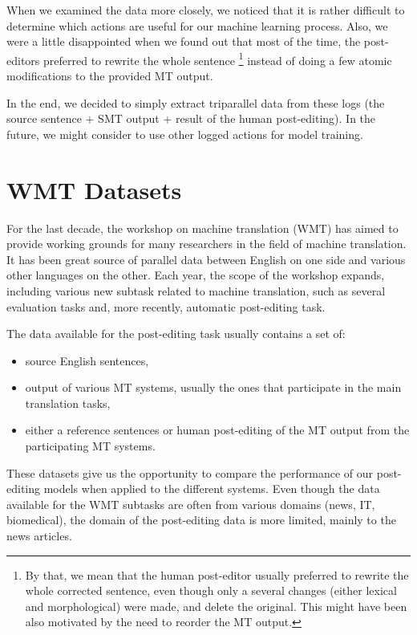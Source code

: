 When we examined the data more closely,
we noticed that it is rather difficult to determine which actions are
useful for our machine learning process. Also, we were a little disappointed
when we found out that most of the time, the post-editors preferred to
rewrite the whole sentence \footnote{By that, we mean that the
human post-editor usually preferred to rewrite the whole corrected sentence, even though
only a several changes (either lexical and morphological) were made, and delete the original.
This might have been also motivated by the need to reorder the MT output.}
instead of doing a few atomic modifications to the provided MT output.

In the end, we decided to simply extract triparallel data from these logs (the source
sentence + SMT output + result of the human post-editing). In the future,
we might consider to use other logged actions for model training.

\section{WMT Datasets}

For the last decade, the workshop on machine translation (WMT) has aimed
to provide working grounds for many researchers in the field of machine
translation. It has been great source of parallel data between English
on one side and various other languages on the other. Each year, the scope
of the workshop expands, including various new subtask related to machine translation,
such as several evaluation tasks and, more recently, automatic post-editing task.

The data available for the post-editing task usually contains a set of:
\begin{itemize}
    \item source English sentences,
    \item output of various MT systems, usually the ones that participate in the main
translation tasks,
    \item either a reference sentences or human post-editing of the MT output from the participating MT systems.
\end{itemize}

These datasets give us the opportunity to compare the performance of our post-editing
models when applied to the different systems. Even though the data available for the
WMT subtasks are often from various domains (news, IT, biomedical), the domain of the post-editing
data is more limited, mainly to the news articles.

